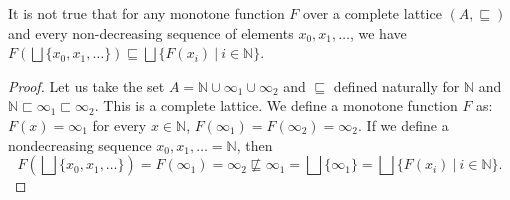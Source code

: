 \begin{remark}
    It is not true that for any monotone function $F$ over a complete lattice $(A, \sqsubseteq)$ and every non-decreasing sequence of elements $x_0, x_1, \ldots$, we have $F(\bigsqcup\{x_0, x_1, \ldots\}) \sqsubseteq \bigsqcup\{F(x_i) ~|~ i \in \mathbb{N}\}$.
\end{remark}
\begin{proof}
    Let us take the set $A = \mathbb{N} \cup \infty_1 \cup \infty_2$ and $\sqsubseteq$ defined naturally for $\mathbb{N}$ and $\mathbb{N} \sqsubset \infty_1 \sqsubset \infty_2$. This is a complete lattice. We define a monotone function $F$ as: $F(x) = \infty_1$ for every $x \in \mathbb{N}$, $F(\infty_1) = F(\infty_2) = \infty_2$.
    If we define a nondecreasing sequence $x_0, x_1, \ldots = \mathbb{N}$, then
    $$F\left(\bigsqcup\{x_0, x_1, \ldots\}\right) = F(\infty_1) = \infty_2 \not\sqsubseteq \infty_1 = \bigsqcup \{\infty_1\} = \bigsqcup\{F(x_i) ~|~ i \in \mathbb{N}\}.$$
\end{proof}

% 
